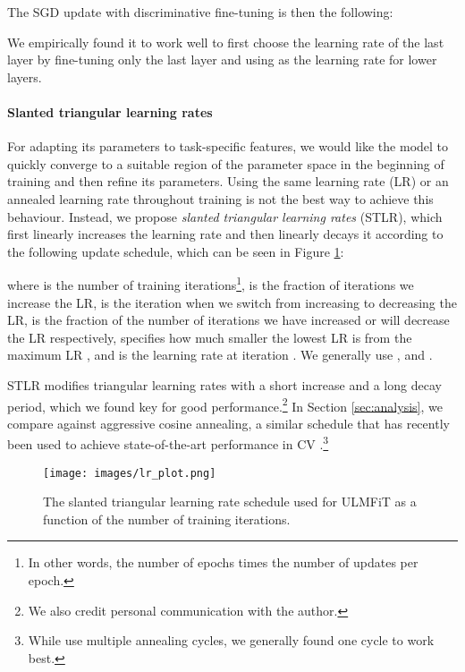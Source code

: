 \documentclass[11pt,a4paper]{article}
\begin{document}
The SGD update with discriminative fine-tuning is then the following:

We empirically found it to work well to first choose the learning rate  of the last layer by fine-tuning only the last layer and using  as the learning rate for lower layers.

\paragraph{Slanted triangular learning rates} For adapting its parameters to task-specific features, we would like the model to quickly converge to a suitable region of the parameter space in the beginning of training and then refine its parameters. Using the same learning rate (LR) or an annealed learning rate throughout training is not the best way to achieve this behaviour. 
Instead, we propose \emph{slanted triangular learning rates} (STLR), which first linearly increases the learning rate and then linearly decays it according to the following update schedule, which can be seen in Figure \ref{fig:triangular_lr}:

where  is the number of training iterations\footnote{In other words, the number of epochs times the number of updates per epoch.},  is the fraction of iterations we increase the LR,  is the iteration when we switch from increasing to decreasing the LR,  is the fraction of the number of iterations we have increased or will decrease the LR respectively,  specifies how much smaller the lowest LR is from the maximum LR , and  is the learning rate at iteration . We generally use ,  and .

STLR modifies triangular learning rates \cite{smith2017cyclical} with a short increase and a long decay period, which we found key for good performance.\footnote{We also credit personal communication with the author.} In Section \ref{sec:analysis}, we compare against aggressive cosine annealing, a similar schedule that has recently been used to achieve state-of-the-art performance in CV \cite{Loshchilov2017}.\footnote{While \citet{Loshchilov2017} use multiple annealing cycles, we generally found one cycle to work best.}

\begin{figure}[h]
\centering
\texttt{[image: images/lr\_plot.png]}
\caption{The slanted triangular learning rate schedule used for ULMFiT as a function of the number of training iterations.}
\label{fig:triangular_lr}
\end{figure}
\end{document}

